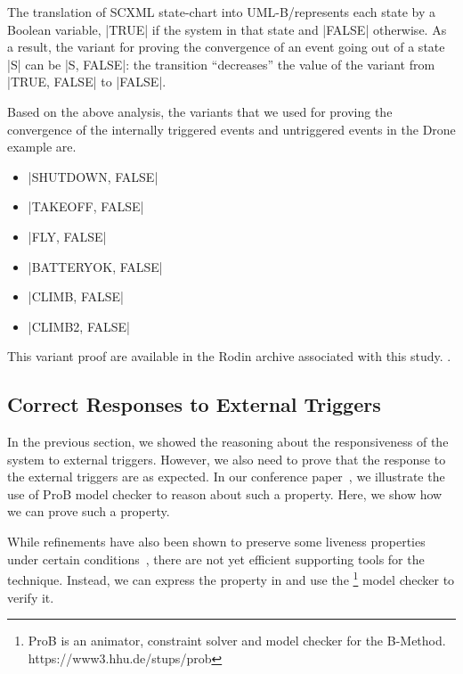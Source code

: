 The translation of SCXML state-chart into UML-B/\EventB represents each
state by a Boolean variable, |TRUE| if the system in that state and
|FALSE| otherwise. As a result, the variant for proving the convergence
of an event going out of a state |S| can be |{S, FALSE}|: the
transition ``decreases'' the value of the variant from |{TRUE, FALSE}|
to |FALSE|.

Based on the above analysis, the variants that we used for proving the
convergence of the internally triggered events and untriggered events
in the Drone example are.
\begin{itemize}
\item |{SHUTDOWN, FALSE}|

\item |{TAKEOFF, FALSE}|

\item |{FLY, FALSE}|

\item |{BATTERYOK, FALSE}|

\item |{CLIMB, FALSE}|

\item |{CLIMB2, FALSE}|
\end{itemize}

This variant proof are available in the Rodin archive associated with this study.
.


\subsection{Correct Responses to External Triggers}
\label{sec:corr-resp-extern}
In the previous section, we showed the reasoning about the
responsiveness of the system to external triggers.  However, we also
need to prove that the response to the external triggers are as
expected.  In our conference paper~\cite{detect2020}, we illustrate
the use of ProB model checker to reason about such a property.  Here,
we show how we can prove such a property.

While \EventB refinements have also been shown to preserve some liveness properties under certain conditions~\cite{hoang2016ltl}, there are not yet efficient supporting tools for the technique.%
Instead, we can express the property in \LTL  and use the \PROB\footnote{ProB is an animator, constraint solver and model checker for the B-Method. https://www3.hhu.de/stups/prob} model checker to verify it.

